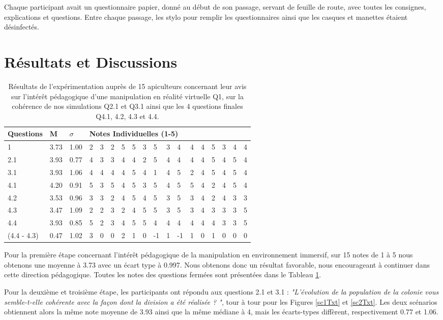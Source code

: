 		Chaque participant avait un questionnaire papier, donné au début de son passage, servant de feuille de route, avec toutes les consignes, explications et questions. Entre chaque passage, les stylo pour remplir les questionnaires ainsi que les casques et manettes étaient désinfectés. 		
		
		
	\section{Résultats et Discussions}
	
	\begin{table}
	\centering
	\begin{tabular}{l|l|l|lllllllllllllll}
	\textbf{Questions} & \textbf{M} & \textbf{$\sigma$} & \multicolumn{15}{l}{\textbf{Notes Individuelles (1-5)}}\\
	\hline
	1 & 3.73 & 1.00          &2&3&2&5&5&3&5&3&4&4&4&5&3&4&4\\
	\hline
	2.1 & 3.93 & 0.77        &4&3&3&4&4&2&5&4&4&4&4&5&4&5&4\\
	\hline
	3.1 & 3.93 & 1.06        &4&4&4&4&5&4&1&4&5&2&4&5&4&5&4\\	
	\hline
	4.1 & 4.20 & 0.91        &5&3&5&4&5&3&5&4&5&5&4&2&4&5&4\\
	\hline
	4.2 & 3.53 & 0.96        &3&3&2&4&5&4&5&3&5&3&4&2&4&3&3\\
	\hline
	4.3 & 3.47 & 1.09        &2&2&3&2&4&5&5&3&5&3&4&3&3&3&5\\
	\hline
	4.4 & 3.93 & 0.85        &5&2&3&4&5&5&4&4&4&4&4&4&3&3&5\\
	\hline
	(4.4 - 4.3) & 0.47 & 1.02&3&0&0&2&1&0&-1&1&-1&1&0&1&0&0&0\\
	\end{tabular}
	\caption{Résultats de l'expérimentation auprès de 15 apiculteurs concernant leur avis sur l'intérêt pédagogique d'une manipulation en réalité virtuelle Q1, sur la cohérence de nos simulations Q2.1 et Q3.1 ainsi que les 4 questions finales Q4.1, 4.2, 4.3 et 4.4.}
	\label{TabResVR}
	\end{table}

	
	Pour la première étape concernant l'intérêt pédagogique de la manipulation en environnement immersif, sur 15 notes de 1 à 5 nous obtenons une moyenne à 3.73 avec un écart type à 0.997.  Nous obtenons donc un résultat favorable, nous encourageant à continuer dans cette direction pédagogique. Toutes les notes des questions fermées sont présentées dans le Tableau \ref{TabResVR}.
	
    Pour la deuxième et troisième étape, les participants ont répondu aux questions 2.1 et 3.1 : \textit{"L'évolution de la population de la colonie vous semble-t-elle cohérente avec la façon dont la division a été réalisée ? "}, tour à tour pour les Figures \ref{sc1Txt} et \ref{sc2Txt}. Les deux scénarios obtiennent alors la même note moyenne de 3.93 ainsi que la même médiane à 4, mais les écarts-types diffèrent, respectivement 0.77 et 1.06.
    
